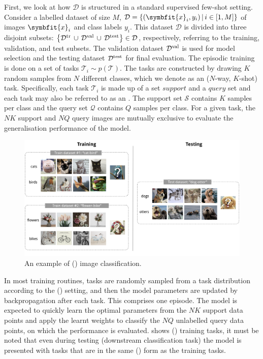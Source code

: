 First, we look at how \(\mathcal{D}\) is structured in a standard supervised few-shot setting. 
Consider a labelled dataset of size $M$, $\mathcal{D} = \left\{(\symbfit{x}_i, y_i)\, |\, i \in [1,M] \right\}$ of images $\symbfit{x}_i$ and class labels $y_i$. 
This dataset $\mathcal{D}$ is divided into three disjoint subsets: $\left\{\mathcal{D}^\textup{tr}\, \cup\, \mathcal{D}^\textup{val}\, \cup\, \mathcal{D}^\textup{test}\right\} \in \mathcal{D}$, respectively, referring to the training, validation, and test subsets. The validation dataset $\mathcal{D}^\textup{val}$ is used for model selection and the testing dataset $\mathcal{D}^\textup{test}$ for final evaluation. The episodic training is done on a set of tasks $\mathcal{T}_i \sim p(\mathcal{T})$. The tasks are constructed by drawing $K$ random samples from $N$ different classes, which we denote as an ($N$-way, $K$-shot) task. 
Specifically, each task $\mathcal{T}_i$ is made up of a set $\textit{support}$ and a $\textit{query}$ set and each task may also be referred to as an . The support set $\mathcal{S}$ contains $K$ samples per class and the query set $\mathcal{Q}$ contains $Q$ samples per class. For a given task, the $NK$ support and $NQ$ query images are mutually exclusive to evaluate the generalisation performance of the model.
\begin{figure}[ht]
    \centering
    \captionsetup{justification=centering}
    \includegraphics[width=\linewidth]{chapters/assets/fsl/few-shot-classification.png}
    \caption{An example of () image classification.}
    \label{fig:fsl-tasks}
\end{figure}

In most training routines, tasks are randomly sampled from a task distribution according to the () setting, and then the model parameters are updated by backpropagation after each task.
This comprises one episode. The model is expected to quickly learn the optimal parameters from the $NK$ support data points and apply the learnt weights to classify the $NQ$ unlabelled query data points, on which the performance is evaluated.
 shows () training tasks, it must be noted that even during testing (downstream classification task) the model is presented with tasks that are in the same () form as the training tasks.

